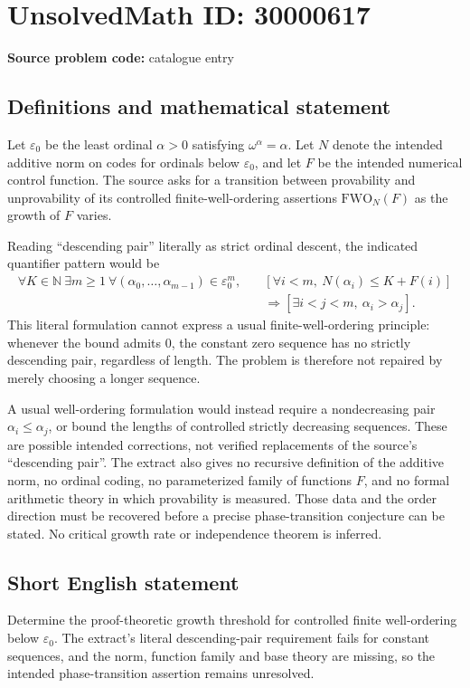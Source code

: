 \documentclass[11pt]{article}
\newcommand{\N}{\mathbb{N}}
\begin{document}
\section*{UnsolvedMath ID: 30000617}
\textbf{Source problem code:} catalogue entry
\subsection{Definitions and mathematical statement}
Let $\varepsilon_0$ be the least ordinal $\alpha>0$ satisfying $\omega^\alpha=\alpha$. Let $N$ denote the intended additive norm on codes for ordinals below $\varepsilon_0$, and let $F$ be the intended numerical control function. The source asks for a transition between provability and unprovability of its controlled finite-well-ordering assertions $\mathrm{FWO}_N(F)$ as the growth of $F$ varies.

Reading ``descending pair'' literally as strict ordinal descent, the indicated quantifier pattern would be
\[
\begin{split}
\forall K\in\N\ \exists m\geq1\ \forall(\alpha_0,\ldots,\alpha_{m-1})\in\varepsilon_0^m,
\quad&
\left[\forall i<m,\ N(\alpha_i)\leq K+F(i)\right]\\
&\Longrightarrow\left[\exists i<j<m,\ \alpha_i>\alpha_j\right].
\end{split}
\]
This literal formulation cannot express a usual finite-well-ordering principle: whenever the bound admits $0$, the constant zero sequence has no strictly descending pair, regardless of length. The problem is therefore not repaired by merely choosing a longer sequence.

A usual well-ordering formulation would instead require a nondecreasing pair $\alpha_i\leq\alpha_j$, or bound the lengths of controlled strictly decreasing sequences. These are possible intended corrections, not verified replacements of the source's ``descending pair''. The extract also gives no recursive definition of the additive norm, no ordinal coding, no parameterized family of functions $F$, and no formal arithmetic theory in which provability is measured. Those data and the order direction must be recovered before a precise phase-transition conjecture can be stated. No critical growth rate or independence theorem is inferred.
\subsection{Short English statement}
Determine the proof-theoretic growth threshold for controlled finite well-ordering below $\varepsilon_0$. The extract's literal descending-pair requirement fails for constant sequences, and the norm, function family and base theory are missing, so the intended phase-transition assertion remains unresolved.
\end{document}
